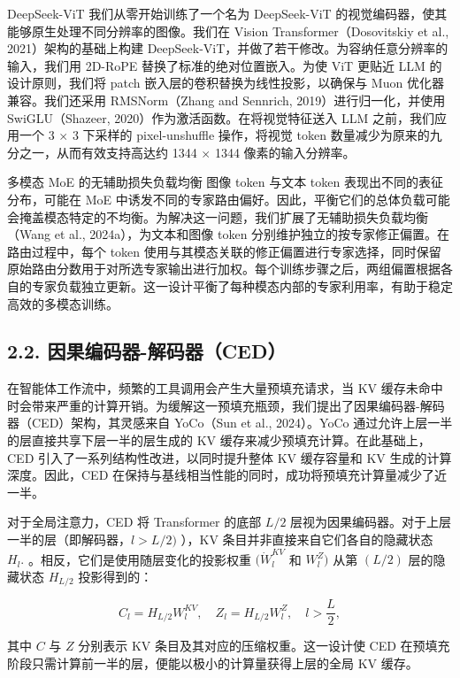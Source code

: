 DeepSeek-ViT 我们从零开始训练了一个名为 DeepSeek-ViT 的视觉编码器，使其能够原生处理不同分辨率的图像。我们在 Vision Transformer（Dosovitskiy et al., 2021）架构的基础上构建 DeepSeek-ViT，并做了若干修改。为容纳任意分辨率的输入，我们用 2D-RoPE 替换了标准的绝对位置嵌入。为使 ViT 更贴近 LLM 的设计原则，我们将 patch 嵌入层的卷积替换为线性投影，以确保与 Muon 优化器兼容。我们还采用 RMSNorm（Zhang and Sennrich, 2019）进行归一化，并使用 SwiGLU（Shazeer, 2020）作为激活函数。在将视觉特征送入 LLM 之前，我们应用一个 3 $\times$ 3 下采样的 pixel-unshuffle 操作，将视觉 token 数量减少为原来的九分之一，从而有效支持高达约 1344 $\times$ 1344 像素的输入分辨率。

多模态 MoE 的无辅助损失负载均衡 图像 token 与文本 token 表现出不同的表征分布，可能在 MoE 中诱发不同的专家路由偏好。因此，平衡它们的总体负载可能会掩盖模态特定的不均衡。为解决这一问题，我们扩展了无辅助损失负载均衡（Wang et al., 2024a），为文本和图像 token 分别维护独立的按专家修正偏置。在路由过程中，每个 token 使用与其模态关联的修正偏置进行专家选择，同时保留原始路由分数用于对所选专家输出进行加权。每个训练步骤之后，两组偏置根据各自的专家负载独立更新。这一设计平衡了每种模态内部的专家利用率，有助于稳定高效的多模态训练。



\subsection{2.2. 因果编码器-解码器（CED）}\label{causal-encoder-decoder-ced}

在智能体工作流中，频繁的工具调用会产生大量预填充请求，当 KV 缓存未命中时会带来严重的计算开销。为缓解这一预填充瓶颈，我们提出了因果编码器-解码器（CED）架构，其灵感来自 YoCo（Sun et al., 2024）。YoCo 通过允许上层一半的层直接共享下层一半的层生成的 KV 缓存来减少预填充计算。在此基础上，CED 引入了一系列结构性改进，以同时提升整体 KV 缓存容量和 KV 生成的计算深度。因此，CED 在保持与基线相当性能的同时，成功将预填充计算量减少了近一半。

对于全局注意力，CED 将 Transformer 的底部 \(L / 2\) 层视为因果编码器。对于上层一半的层（即解码器，\(l > L / 2 )\) ），KV 条目并非直接来自它们各自的隐藏状态 \(H _ { l } .\) 。相反，它们是使用随层变化的投影权重 \(( \dot { W } _ { l } ^ { K V }\) 和 \(W _ { l } ^ { Z } )\) 从第 \(( L / 2 )\) 层的隐藏状态 \(H _ { L / 2 }\) 投影得到的：

\[
C _ { l } = H _ { L / 2 } W _ { l } ^ { K V } , \quad Z _ { l } = H _ { L / 2 } W _ { l } ^ { Z } , \quad l > \frac { L } { 2 } ,\tag{1}
\]

其中 $C$ 与 $Z$ 分别表示 KV 条目及其对应的压缩权重。这一设计使 CED 在预填充阶段只需计算前一半的层，便能以极小的计算量获得上层的全局 KV 缓存。

